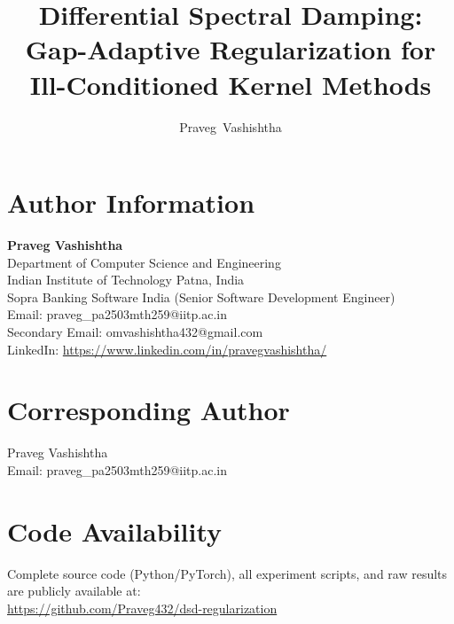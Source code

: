 \documentclass[journal]{IEEEtran}
\begin{document}
\title{Differential Spectral Damping: Gap-Adaptive Regularization for Ill-Conditioned Kernel Methods}

\author{Praveg~Vashishtha}

\maketitle

\section*{Author Information}

\textbf{Praveg Vashishtha} \\
Department of Computer Science and Engineering \\
Indian Institute of Technology Patna, India \\
Sopra Banking Software India (Senior Software Development Engineer) \\
Email: praveg\_pa2503mth259@iitp.ac.in \\
Secondary Email: omvashishtha432@gmail.com \\
LinkedIn: \url{https://www.linkedin.com/in/pravegvashishtha/}

\section*{Corresponding Author}

Praveg Vashishtha \\
Email: praveg\_pa2503mth259@iitp.ac.in

\section*{Code Availability}

Complete source code (Python/PyTorch), all experiment scripts, and raw results are publicly available at: \\
\url{https://github.com/Praveg432/dsd-regularization}
\end{document}
